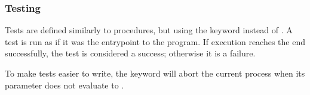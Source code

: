 \subsubsection{Testing}

Tests are defined similarly to procedures, but using the keyword 
instead of . A test is run as if it was the entrypoint to the
program. If execution reaches the end successfully, the test is
considered a success; otherwise it is a failure.


To make tests easier to write, the  keyword will abort the
current process when its parameter does not evaluate to .
